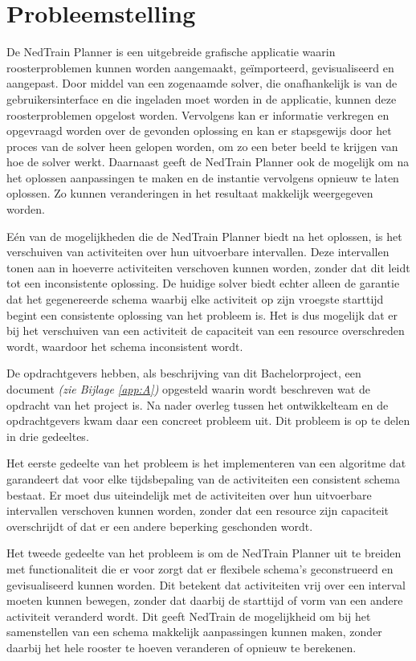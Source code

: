\section{Probleemstelling}
\label{sec:probleemstelling}

De NedTrain Planner is een uitgebreide grafische applicatie waarin roosterproblemen kunnen worden aangemaakt, ge\"importeerd, gevisualiseerd en aangepast. Door middel van een zogenaamde solver, die onafhankelijk is van de gebruikersinterface en die ingeladen moet worden in de applicatie, kunnen deze roosterproblemen opgelost worden. Vervolgens kan er informatie verkregen en opgevraagd worden over de gevonden oplossing en kan er stapsgewijs door het proces van de solver heen gelopen worden, om zo een beter beeld te krijgen van hoe de solver werkt. Daarnaast geeft de NedTrain Planner ook de mogelijk om na het oplossen aanpassingen te maken en de instantie vervolgens opnieuw te laten oplossen. Zo kunnen veranderingen in het resultaat makkelijk weergegeven worden.

E\'en van de mogelijkheden die de NedTrain Planner biedt na het oplossen, is het verschuiven van activiteiten over hun uitvoerbare intervallen. Deze intervallen tonen aan in hoeverre activiteiten verschoven kunnen worden, zonder dat dit leidt tot een inconsistente oplossing. De huidige solver biedt echter alleen de garantie dat het gegenereerde schema waarbij elke activiteit op zijn vroegste starttijd begint een consistente oplossing van het probleem is. Het is dus mogelijk dat er bij het verschuiven van een activiteit de capaciteit van een resource overschreden wordt, waardoor het schema inconsistent wordt.

De opdrachtgevers hebben, als beschrijving van dit Bachelorproject, een document \emph{(zie Bijlage \ref{app:A})} opgesteld waarin wordt beschreven wat de opdracht van het project is. Na nader overleg tussen het ontwikkelteam en de opdrachtgevers kwam daar een concreet probleem uit. Dit probleem is op te delen in drie gedeeltes. 

Het eerste gedeelte van het probleem is het implementeren van een algoritme dat garandeert dat voor elke tijdsbepaling van de activiteiten een consistent schema bestaat. Er moet dus uiteindelijk met de activiteiten over hun uitvoerbare intervallen verschoven kunnen worden, zonder dat een resource zijn capaciteit overschrijdt of dat er een andere beperking geschonden wordt.

Het tweede gedeelte van het probleem is om de NedTrain Planner uit te breiden met functionaliteit die er voor zorgt dat er flexibele schema's geconstrueerd en gevisualiseerd kunnen worden. Dit betekent dat activiteiten vrij over een interval moeten kunnen bewegen, zonder dat daarbij de starttijd of vorm van een andere activiteit veranderd wordt. Dit geeft NedTrain de mogelijkheid om bij het samenstellen van een schema makkelijk aanpassingen kunnen maken, zonder daarbij het hele rooster te hoeven veranderen of opnieuw te berekenen.


